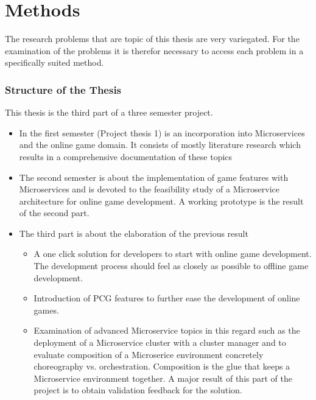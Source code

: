 \chapter{Methods}

The research problems that are topic of this thesis are very variegated. For the
examination of the problems it is therefor necessary to access each problem in a
specifically suited method. 



\subsection{Structure of the Thesis}

This thesis is the third part of a three semester project.

\begin{itemize}
  \item In the first semester (Project thesis 1) is an incorporation into
  Microservices and the online game domain. It consists of mostly literature
  research which results in a comprehensive documentation of these topics
  \item The second semester is about the implementation of game features with
  Microservices and is devoted to the feasibility study of a Microservice
  architecture for online game development. A working prototype is the result of
  the second part.
  \item The third part is about the elaboration of the previous result
  	\begin{itemize}
  	  \item A one click solution for developers to start with online game
  	  development. The development process should feel as closely as possible to
  	  offline game development.
  	  \item Introduction of PCG features to further ease the development of
  	  online games.
  	  \item Examination of advanced Microservice topics in this regard such as
  	  the deployment of a Microservice cluster with a cluster manager and to 
  	  evaluate composition of a Microserice environment concretely choreography
  	  vs. orchestration. Composition is the glue that keeps a Microservice
  	  environment together. A major result of this part of the project is
  	  to obtain validation feedback for the solution.
	\end{itemize}
  
\end{itemize}


